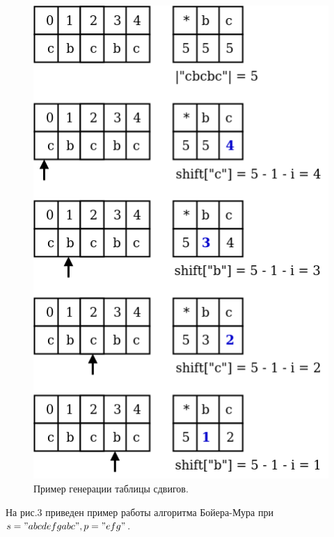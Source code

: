 \documentclass[12pt]{report}
\begin{document}
\begin{figure}[H]	
	{
		\centering
		\includegraphics[scale=0.40]{2.png}
		\caption{Пример генерации таблицы сдвигов.}
		\label{pic:ant_schema}
	}
\end{figure}


На рис.3 приведен пример работы алгоритма Бойера-Мура при $s = "abcdefgabc", p = "efg"$.
\end{document}
